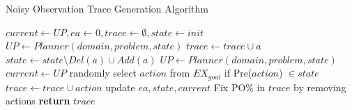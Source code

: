 \begin{algorithm}
    \caption{Noisy Observation Trace Generation Algorithm}
    \label{alg:noisytrace}
    \begin{algorithmic}[1] %
        	\State $current\gets UP, ea\gets 0, trace\gets \emptyset, state \gets init$
        	\State $UP\gets Planner(domain,problem,state)$
        		\State $trace \gets trace \cup a$
        		\State $state\gets state\setminus Del(a)\cup Add(a)$
        		\EndIf
        		\State $UP\gets Planner(domain,problem,state)$
        		\State $current\gets UP$
        		\State randomly select $action$ from $EX_{goal}$ if Pre($action$) $\in state$
        		\State $trace \gets trace \cup action$
        		\State update $ea, state, current$
        		\EndIf
        	\EndFor
        	\State Fix PO\% in $trace$ by removing actions
            \State \textbf{return} $trace$
        \EndProcedure
    \end{algorithmic}
\end{algorithm}





